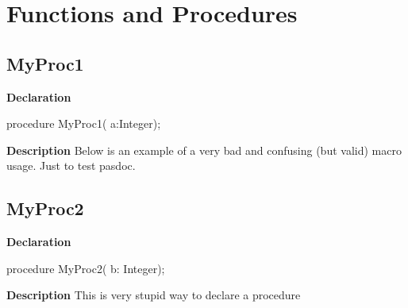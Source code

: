 \documentclass{report}
\newif\ifpdf
\begin{document}
\section{Functions and Procedures}
\ifpdf
\subsection*{\large{\textbf{MyProc1}}\normalsize\hspace{1ex}\hrulefill}
\else
\subsection*{MyProc1}
\fi
\label{ok_macros-MyProc1}
\begin{list}{}{
\setlength{\itemindent}{0cm}
\setlength{\listparindent}{0cm}
\setlength{\leftmargin}{\evensidemargin}
\addtolength{\leftmargin}{\tmplength}
\settowidth{\labelsep}{X}
\addtolength{\leftmargin}{\labelsep}
\setlength{\labelwidth}{\tmplength}
}
\item[\textbf{Declaration}\hfill]
\ifpdf
\begin{flushleft}
\fi
\begin{ttfamily}
procedure MyProc1( a:Integer);\end{ttfamily}

\ifpdf
\end{flushleft}
\fi

\par
\item[\textbf{Description}]
Below is an example of a very bad and confusing (but valid) macro usage. Just to test pasdoc.

\end{list}
\ifpdf
\subsection*{\large{\textbf{MyProc2}}\normalsize\hspace{1ex}\hrulefill}
\else
\subsection*{MyProc2}
\fi
\label{ok_macros-MyProc2}
\begin{list}{}{
\setlength{\itemindent}{0cm}
\setlength{\listparindent}{0cm}
\setlength{\leftmargin}{\evensidemargin}
\addtolength{\leftmargin}{\tmplength}
\settowidth{\labelsep}{X}
\addtolength{\leftmargin}{\labelsep}
\setlength{\labelwidth}{\tmplength}
}
\item[\textbf{Declaration}\hfill]
\ifpdf
\begin{flushleft}
\fi
\begin{ttfamily}
procedure MyProc2( b: Integer);\end{ttfamily}

\ifpdf
\end{flushleft}
\fi

\par
\item[\textbf{Description}]
This is very stupid way to declare a procedure

\end{list}
\ifpdf
\end{document}
